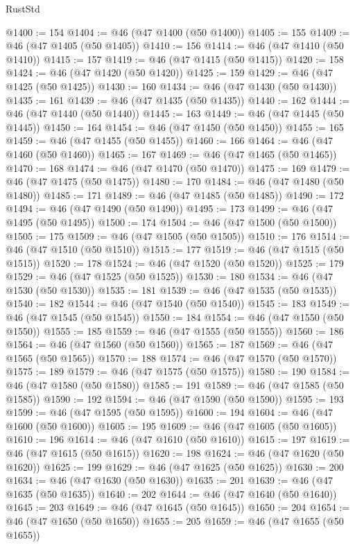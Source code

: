\begin{lexlean}{RustStd}
\begin{coremodule}
@1400 := 154
@1404 := @46 (@47 @1400 (@50 @1400))
@1405 := 155
@1409 := @46 (@47 @1405 (@50 @1405))
@1410 := 156
@1414 := @46 (@47 @1410 (@50 @1410))
@1415 := 157
@1419 := @46 (@47 @1415 (@50 @1415))
@1420 := 158
@1424 := @46 (@47 @1420 (@50 @1420))
@1425 := 159
@1429 := @46 (@47 @1425 (@50 @1425))
@1430 := 160
@1434 := @46 (@47 @1430 (@50 @1430))
@1435 := 161
@1439 := @46 (@47 @1435 (@50 @1435))
@1440 := 162
@1444 := @46 (@47 @1440 (@50 @1440))
@1445 := 163
@1449 := @46 (@47 @1445 (@50 @1445))
@1450 := 164
@1454 := @46 (@47 @1450 (@50 @1450))
@1455 := 165
@1459 := @46 (@47 @1455 (@50 @1455))
@1460 := 166
@1464 := @46 (@47 @1460 (@50 @1460))
@1465 := 167
@1469 := @46 (@47 @1465 (@50 @1465))
@1470 := 168
@1474 := @46 (@47 @1470 (@50 @1470))
@1475 := 169
@1479 := @46 (@47 @1475 (@50 @1475))
@1480 := 170
@1484 := @46 (@47 @1480 (@50 @1480))
@1485 := 171
@1489 := @46 (@47 @1485 (@50 @1485))
@1490 := 172
@1494 := @46 (@47 @1490 (@50 @1490))
@1495 := 173
@1499 := @46 (@47 @1495 (@50 @1495))
@1500 := 174
@1504 := @46 (@47 @1500 (@50 @1500))
@1505 := 175
@1509 := @46 (@47 @1505 (@50 @1505))
@1510 := 176
@1514 := @46 (@47 @1510 (@50 @1510))
@1515 := 177
@1519 := @46 (@47 @1515 (@50 @1515))
@1520 := 178
@1524 := @46 (@47 @1520 (@50 @1520))
@1525 := 179
@1529 := @46 (@47 @1525 (@50 @1525))
@1530 := 180
@1534 := @46 (@47 @1530 (@50 @1530))
@1535 := 181
@1539 := @46 (@47 @1535 (@50 @1535))
@1540 := 182
@1544 := @46 (@47 @1540 (@50 @1540))
@1545 := 183
@1549 := @46 (@47 @1545 (@50 @1545))
@1550 := 184
@1554 := @46 (@47 @1550 (@50 @1550))
@1555 := 185
@1559 := @46 (@47 @1555 (@50 @1555))
@1560 := 186
@1564 := @46 (@47 @1560 (@50 @1560))
@1565 := 187
@1569 := @46 (@47 @1565 (@50 @1565))
@1570 := 188
@1574 := @46 (@47 @1570 (@50 @1570))
@1575 := 189
@1579 := @46 (@47 @1575 (@50 @1575))
@1580 := 190
@1584 := @46 (@47 @1580 (@50 @1580))
@1585 := 191
@1589 := @46 (@47 @1585 (@50 @1585))
@1590 := 192
@1594 := @46 (@47 @1590 (@50 @1590))
@1595 := 193
@1599 := @46 (@47 @1595 (@50 @1595))
@1600 := 194
@1604 := @46 (@47 @1600 (@50 @1600))
@1605 := 195
@1609 := @46 (@47 @1605 (@50 @1605))
@1610 := 196
@1614 := @46 (@47 @1610 (@50 @1610))
@1615 := 197
@1619 := @46 (@47 @1615 (@50 @1615))
@1620 := 198
@1624 := @46 (@47 @1620 (@50 @1620))
@1625 := 199
@1629 := @46 (@47 @1625 (@50 @1625))
@1630 := 200
@1634 := @46 (@47 @1630 (@50 @1630))
@1635 := 201
@1639 := @46 (@47 @1635 (@50 @1635))
@1640 := 202
@1644 := @46 (@47 @1640 (@50 @1640))
@1645 := 203
@1649 := @46 (@47 @1645 (@50 @1645))
@1650 := 204
@1654 := @46 (@47 @1650 (@50 @1650))
@1655 := 205
@1659 := @46 (@47 @1655 (@50 @1655))

\end{coremodule}
\end{lexlean}
